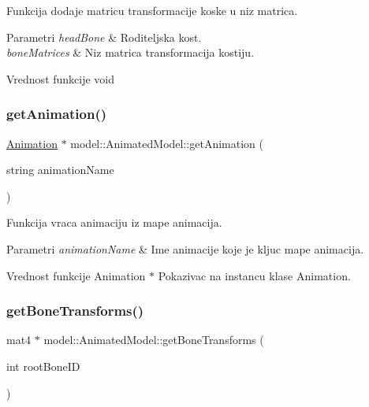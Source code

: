 Funkcija dodaje matricu transformacije koske u niz matrica. 


\begin{DoxyParams}{Parametri}
{\em head\+Bone} & Roditeljska kost. \\
\hline
{\em bone\+Matrices} & Niz matrica transformacija kostiju. \\
\hline
\end{DoxyParams}
\begin{DoxyReturn}{Vrednost funkcije}
void 
\end{DoxyReturn}
\mbox{\label{classmodel_1_1AnimatedModel_ada1c3b1e93e2934ba085dd14e65e364a}} 
\subsubsection{\texorpdfstring{get\+Animation()}{getAnimation()}}
{\footnotesize\ttfamily \hyperlink{classanimation_1_1Animation}{Animation} $\ast$ model\+::\+Animated\+Model\+::get\+Animation (\begin{DoxyParamCaption}\item[{string}]{animation\+Name }\end{DoxyParamCaption})}



Funkcija vraca animaciju iz mape animacija. 


\begin{DoxyParams}{Parametri}
{\em animation\+Name} & Ime animacije koje je kljuc mape animacija. \\
\hline
\end{DoxyParams}
\begin{DoxyReturn}{Vrednost funkcije}
Animation $\ast$ Pokazivac na instancu klase Animation. 
\end{DoxyReturn}
\mbox{\label{classmodel_1_1AnimatedModel_a1769cb021a4128bda636eab48e4c55cc}} 
\subsubsection{\texorpdfstring{get\+Bone\+Transforms()}{getBoneTransforms()}}
{\footnotesize\ttfamily mat4 $\ast$ model\+::\+Animated\+Model\+::get\+Bone\+Transforms (\begin{DoxyParamCaption}\item[{int}]{root\+Bone\+ID }\end{DoxyParamCaption})}



